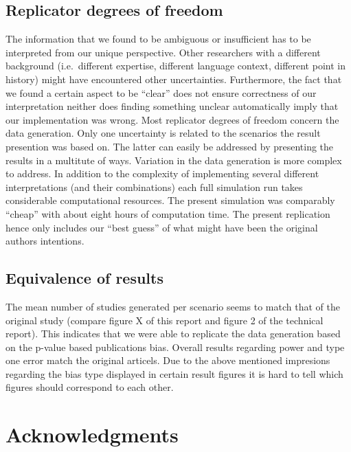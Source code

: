 \documentclass[
  english,
  doc,floatsintext,draftall]{apa6}
\begin{document}
\hypertarget{replicator-degrees-of-freedom-1}{%
\subsection{Replicator degrees of freedom}\label{replicator-degrees-of-freedom-1}}

The information that we found to be ambiguous or insufficient has to be interpreted from our unique perspective.
Other researchers with a different background (i.e.~different expertise, different language context, different point in history) might have encountered other uncertainties.
Furthermore, the fact that we found a certain aspect to be \enquote{clear} does not ensure correctness of our interpretation neither does finding something unclear automatically imply that our implementation was wrong.
Most replicator degrees of freedom concern the data generation.
Only one uncertainty is related to the scenarios the result presention was based on.
The latter can easily be addressed by presenting the results in a multitute of ways.
Variation in the data generation is more complex to address.
In addition to the complexity of implementing several different interpretations (and their combinations) each full simulation run takes considerable computational resources.
The present simulation was comparably \enquote{cheap} with about eight hours of computation time.
The present replication hence only includes our \enquote{best guess} of what might have been the original authors intentions.

\hypertarget{equivalence-of-results}{%
\subsection{Equivalence of results}\label{equivalence-of-results}}

The mean number of studies generated per scenario seems to match that of the original study (compare figure X of this report and figure 2 of the technical report).
This indicates that we were able to replicate the data generation based on the p-value based publications bias.
Overall results regarding power and type one error match the original articels.
Due to the above mentioned impresions regarding the bias type displayed in certain result figures it is hard to tell which figures should correspond to each other.

\hypertarget{acknowledgments}{%
\section{Acknowledgments}\label{acknowledgments}}
\end{document}
